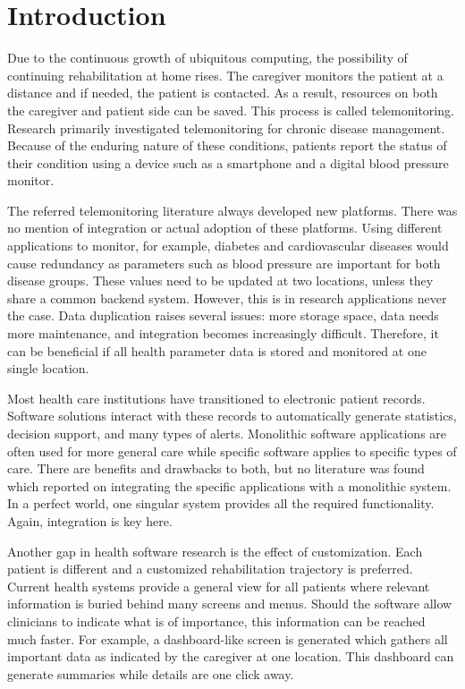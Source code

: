 \section{Introduction}

Due to the continuous growth of ubiquitous computing, the possibility of continuing rehabilitation at home rises. The caregiver monitors the patient at a distance and if needed, the patient is contacted. As a result, resources on both the caregiver and patient side can be saved. This process is called telemonitoring. Research primarily investigated telemonitoring for chronic disease management. Because of the enduring nature of these conditions, patients report the status of their condition using a device such as a smartphone and a digital blood pressure monitor.

\sloppy The referred telemonitoring literature always developed new platforms. There was no mention of integration or actual adoption of these platforms. Using different applications to monitor, for example, diabetes and cardiovascular diseases would cause redundancy as parameters such as blood pressure are important for both disease groups. These values need to be updated at two locations, unless they share a common backend system. However, this is in research applications never the case. Data duplication raises several issues: more storage space, data needs more maintenance, and integration becomes increasingly difficult. Therefore, it can be beneficial if all health parameter data is stored and monitored at one single location.

Most health care institutions have transitioned to electronic patient records. Software solutions interact with these records to automatically generate statistics, decision support, and many types of alerts. Monolithic software applications are often used for more general care while specific software applies to specific types of care. There are benefits and drawbacks to both, but no literature was found which reported on integrating the specific applications with a monolithic system. In a perfect world, one singular system provides all the required functionality. Again, integration is key here.

Another gap in health software research is the effect of customization. Each patient is different and a customized rehabilitation trajectory is preferred. Current health systems provide a general view for all patients where relevant information is buried behind many screens and menus. Should the software allow clinicians to indicate what is of importance, this information can be reached much faster. For example, a dashboard-like screen is generated which gathers all important data as indicated by the caregiver at one location. This dashboard can generate summaries while details are one click away. 

